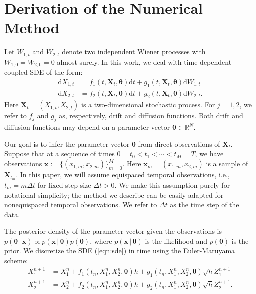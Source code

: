 \documentclass[graybox]{svmult}
\newcommand{\btheta}{\ensuremath{\boldsymbol{\theta}}}
\begin{document}
\section{Derivation of the Numerical Method}
\label{sec:2}
Let $W_{1,t}$ and $W_{2,t}$ denote two independent Wiener processes with $W_{1,0} = W_{2,0} = 0$ almost surely. In this work, we deal with time-dependent coupled SDE of the form:
\begin{subequations}
\label{eqn:sde}
\begin{align}
\mathrm{d}X_{1,t} &= f_1(t, \mathbf{X}_t, \btheta)\mathrm{d}t + g_1(t, \mathbf{X}_t, \btheta) \mathrm{d}W_{1,t} \\
\mathrm{d}X_{2,t} &= f_2(t, \mathbf{X}_t, \btheta)\mathrm{d}t + g_2(t, \mathbf{X}_t, \btheta) \mathrm{d}W_{2,t}.
\end{align}
\end{subequations}
Here $\mathbf{X}_t = (X_{1,t}, X_{2,t})$ is a two-dimensional stochastic process. For $j=1, 2$, we refer to $f_j$ and $g_j$ as, respectively, drift and diffusion functions.  Both drift and diffusion functions may depend on a parameter vector $\boldsymbol{\theta}\in \mathbb{R}^{N}$.

Our goal is to infer the parameter vector $\btheta$ from direct observations of $\mathbf{X}_t$.  Suppose that at a sequence of times $0 = t_0 < t_1 < \cdots < t_M = T$, we have observations $\mathbf{x} := \{({x}_{1,m},{x}_{2,m})\}_{m=0}^M$.  Here $\mathbf{x}_m = ({x}_{1,m},{x}_{2,m})$ is a sample of $\mathbf{X}_{t_m}$.  In this paper, we will assume equispaced temporal observations, i.e., $t_m = m \Delta t$ for fixed step size $\Delta t > 0$.  We make this assumption purely for notational simplicity; the method we describe can be easily adapted for nonequispaced temporal observations.  We refer to $\Delta t$ as the time step of the data.

The posterior density of the parameter vector given the observations is
$p(\btheta \, | \, \mathbf{x})  \propto p( \mathbf{x} \, | \, \btheta)  p(\btheta)$,
where $p( \mathbf{x} \, | \, \btheta)$ is the likelihood and $p(\btheta)$ is the prior.  We discretize the SDE (\ref{eqn:sde}) in time using the Euler-Maruyama scheme:
\begin{subequations}
\label{eqn:discretesde}
\begin{align}
X_1^{n+1} &= X_1^{n} + f_1(t_n, X_1^n, X_2^n, \btheta)h + g_1(t_n, X_1^n, X_2^n,  \btheta) \sqrt{h} Z_1^{n+1} \\
X_2^{n+1} &= X_2^{n} + f_2(t_n, X_1^n, X_2^n,\btheta)h + g_2(t_n, X_1^n, X_2^n,\btheta) \sqrt{h} Z_2^{n+1}.
\end{align}
\end{subequations}
\end{document}

